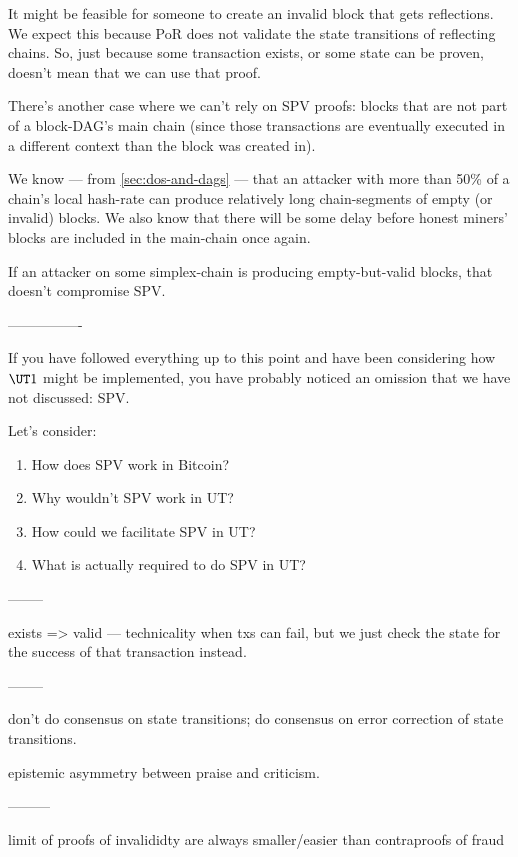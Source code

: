 \begin{draftonly}
It might be feasible for someone to create an invalid block that gets reflections.
We expect this because PoR does not validate the state transitions of reflecting chains.
So, just because some transaction exists, or some state can be proven, doesn't mean that we can use that proof.

There's another case where we can't rely on SPV proofs: blocks that are not part of a block-DAG's main chain (since those transactions are eventually executed in a different context than the block was created in).

We know --- from \autoref{sec:dos-and-dags} --- that an attacker with more than 50\% of a chain's local hash-rate can produce relatively long chain-segments of empty (or invalid) blocks.
We also know that there will be some delay before honest miners' blocks are included in the main-chain once again.

If an attacker on some simplex-chain is producing empty-but-valid blocks, that doesn't compromise SPV.

----------------

If you have followed everything up to this point and have been considering how $\UT1$ might be implemented, you have probably noticed an omission that we have not discussed: SPV.

Let's consider:
\begin{enumerate}
    \item How does SPV work in Bitcoin?
    \item Why wouldn't SPV work in UT?
    \item How could we facilitate SPV in UT?
    \item What is actually required to do SPV in UT?
\end{enumerate}

--------

exists => valid --- technicality when txs can fail, but we just check the state for the success of that transaction instead.

--------

don't do consensus on state transitions; do consensus on error correction of state transitions.

epistemic asymmetry between praise and criticism.

---------

limit of proofs of invalididty are always smaller/easier than contraproofs of fraud

\end{draftonly}
